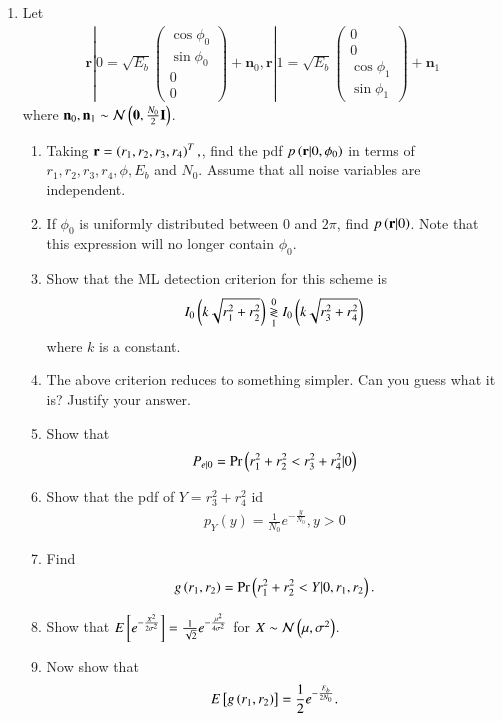 \documentclass[journal,12pt,twocolumn]{IEEEtran}
\renewcommand\thesection{\arabic{section}}
\begin{document}
\begin{enumerate}[label=\thesection.\arabic*
,ref=\thesection.\theenumi]
\item
Let
%
\begin{align}
\mathbf{r}|0= \sqrt{E_b}
\begin{pmatrix}
\cos \phi_0\\
\sin \phi_0 \\
0\\
0
\end{pmatrix}
+\mathbf{n}_0,
\mathbf{r}|1= \sqrt{E_b}
\begin{pmatrix}
0\\
0 \\
\cos \phi_1\\
\sin \phi_1 
\end{pmatrix}
+\mathbf{n}_1
\end{align}
%
where $\mathbf{n}_0,\mathbf{n}_1\sim \mathcal{N}\left(\mathbf{0}, \frac{N_0}{2}\mathbf{I}\right)$.
%
\begin{enumerate}
\item Taking $\mathbf{r} = \left(r_1,r_2,r_3,r_4\right)^{T},$, find the pdf $p\left(\mathbf{r}|0,\phi_0\right)$ in
terms of $r_1,r_2,r_3,r_4,\phi,E_b$ and $N_0$. Assume that all noise variables are independent.
%
\item 
If $\phi_0$ is uniformly distributed between 0 and $2\pi$, find $p\left(\mathbf{r}|0\right)$.  Note that this expression will no longer contain $\phi_0$.
%
\item
Show that the ML detection criterion for this scheme is
%
\begin{align}
I_0\left(k\sqrt{r_1^2+r_2^2}\right)\overset{0}{\underset{1}{\gtrless}}I_0\left(k\sqrt{r_3^2+r_4^2}\right)
\end{align}
%
where $k$ is a constant.
%
\item 
The above criterion reduces to something simpler.  Can you guess what it is?  Justify your answer.
%
\item 
Show that 
%
\begin{align}
P_{e|0}=\Pr\left(r_1^2+r_2^2 < r_3^2+r_4^2 | 0\right)
\end{align}
%
\item 
Show that the pdf of $Y=r_3^2+r_4^2$ id
%
\begin{align}
p_{Y}(y) = \frac{1}{N_0}e^{-\frac{y}{N_0}}, y > 0
\end{align}
%
\item 
Find 
%
\begin{align}
g\left(r_1,r_2\right) = \Pr\left(r_1^2+r_2^2<Y|0,r_1,r_2\right).
\end{align}
\item 
Show that $E{}\left[e^{-\frac{X^2}{2\sigma^2}}\right]=\frac{1}{\sqrt{2}}e^{-\frac{\mu^2}{4\sigma^2}}$ for $X \sim 
\mathcal{N}\left(\mu,\sigma^2\right)$.
%
\item 
Now show that
%
\begin{align}
E{}\left[g\left(r_1,r_2\right)\right]=\frac{1}{2}e^{-\frac{E_b}{2N_0}}.
\end{align}
%
\end{enumerate}


\end{enumerate}
\end{document}
